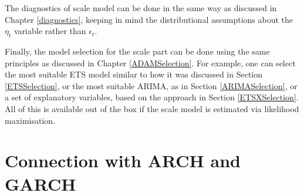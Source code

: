 \documentclass[
]{book}
\theoremstyle{definition}
\theoremstyle{definition}
\theoremstyle{definition}
\theoremstyle{definition}
\theoremstyle{remark}
\begin{document}
The diagnostics of scale model can be done in the same way as discussed in Chapter \ref{diagnostics}, keeping in mind the distributional assumptions about the \(\eta_t\) variable rather than \(\epsilon_t\).

Finally, the model selection for the scale part can be done using the same principles as discussed in Chapter \ref{ADAMSelection}. For example, one can select the most suitable ETS model similar to how it was discussed in Section \ref{ETSSelection}, or the most suitable ARIMA, as in Section \ref{ARIMASelection}, or a set of explanatory variables, based on the approach in Section \ref{ETSXSelection}. All of this is available out of the box if the scale model is estimated via likelihood maximisation.

\hypertarget{ADAMscaleModelGARCH}{%
\section{Connection with ARCH and GARCH}\label{ADAMscaleModelGARCH}}
\end{document}
